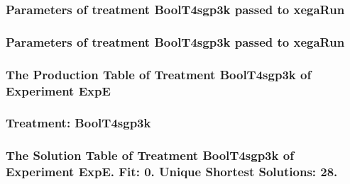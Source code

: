 \documentclass[18pt,c]{beamer}
\begin{document}

 \begin{frame}
 \fontsize{8pt}{9pt}\selectfont
 \frametitle{  Parameters of treatment BoolT4sgp3k passed to xegaRun
 }

 \label{ExpEtParmTable006.tex}  
 \end{frame}


 \begin{frame}
 \fontsize{8pt}{9pt}\selectfont
 \frametitle{  Parameters of treatment BoolT4sgp3k passed to xegaRun
 }

 \label{ExpEtParmTable007.tex}  
 \end{frame}

 \begin{frame}
 \fontsize{8pt}{9pt}\selectfont
 \frametitle{ The Production Table of Treatment BoolT4sgp3k of Experiment ExpE }

 \label{ExpEGrammarTable001.tex}  
 \end{frame}

 \begin{frame}
 \fontsize{8pt}{9pt}\selectfont
 \frametitle{ Treatment: BoolT4sgp3k }

 \label{ExpEStatsTable004.tex}  
 \end{frame}

 \begin{frame}
 \fontsize{8pt}{9pt}\selectfont
 \frametitle{ The Solution Table of Treatment BoolT4sgp3k of Experiment ExpE. Fit: 0. Unique Shortest Solutions: 28. }

 \label{ExpESolutionTable001.tex}  
 \end{frame}
\end{document}
